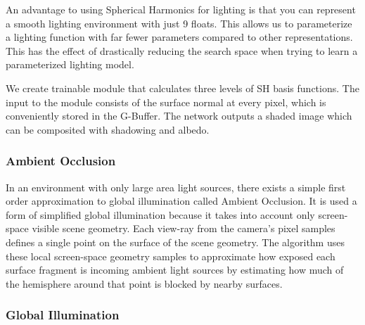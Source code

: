 \documentclass[10pt,twocolumn,letterpaper]{article}
\newcommand{\tompson}[1]{{\color{green} JT: #1}}
\begin{document}
An advantage to using Spherical Harmonics for lighting is that you can represent a smooth lighting environment with just 9 floats. This allows us to parameterize a lighting function with far fewer parameters compared to other representations. This has the effect of drastically reducing the search space when trying to learn a parameterized lighting model.

We create trainable module that calculates three levels of SH basis functions. The input to the module consists of the surface normal at every pixel, which is conveniently stored in the G-Buffer. The network outputs a shaded image which can be composited with shadowing and albedo.

\subsubsection{Ambient Occlusion}

In an environment with only large area light sources, there exists a simple first order approximation to global illumination called Ambient Occlusion. It is used a form of simplified global illumination because it takes into account only screen-space visible  scene geometry\cite{Miller:1994:EAL:192161.192244}.  Each view-ray from the camera's pixel samples defines a single point on the surface of the scene geometry. The algorithm uses these local screen-space geometry samples to approximate how exposed each surface fragment is incoming ambient light sources by estimating how much of the hemisphere around that point is blocked by nearby surfaces. 

\subsubsection{Global Illumination}\label{mitsuba_section}
\end{document}
